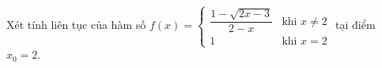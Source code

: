 \begin{ex}
Xét tính liên tục của hàm số $f(x)=\begin{cases}\dfrac{1-\sqrt{2x-3}}{2-x}&\text{khi }x\ne2\\1&\text{khi }x=2\end{cases}$ tại điểm $x_0=2$.
\end{ex}
